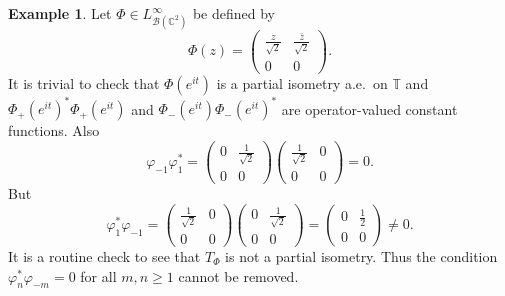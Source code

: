 \documentclass[12pt]{amsart}
\newcommand{\clb}{\mathcal{B}}
\newcommand{\C}{\mathbb{C}}
\newcommand{\T}{\mathbb{T}}
\theoremstyle{definition}
\theoremstyle{plain}
\theoremstyle{definition}
\newtheorem{ex}[thm]{Example}
\numberwithin{equation}{section}
\let\phi=\varphi
\begin{document}
\begin{ex}
Let $\Phi \in L^\infty_{\clb(\C^2)}$ be defined by
\[
\Phi(z)=\begin{pmatrix}
\frac{z}{\sqrt2} &\frac{\bar{z}}{\sqrt{2}}\\
0&0
\end{pmatrix}.
\]
It is trivial to check that $\Phi(e^{it})$ is a partial isometry a.e.\ on $\T$ and  $\Phi_+(e^{it})^*\Phi_+(e^{it})$ and $\Phi_-(e^{it})\Phi_-(e^{it})^*$ are operator-valued constant functions. Also
\[
\phi_{-1}\phi_{1}^*=\begin{pmatrix}
0 & \frac{1}{\sqrt{2}}\\
0 &0
\end{pmatrix}
\begin{pmatrix}
\frac{1}{\sqrt{2}} & 0\\
0 &0
\end{pmatrix}=0.
\]
But
\[
\phi_1^*\phi_{-1}=\begin{pmatrix}
\frac{1}{\sqrt{2}} &0 \\
0&0
\end{pmatrix}
\begin{pmatrix}
0 &\frac{1}{\sqrt{2}}\\
0 &0
\end{pmatrix}=\begin{pmatrix}
0&\frac{1}{2}\\
0 &0
\end{pmatrix} \neq 0.
\]
It is a routine check to see that $T_\Phi$ is not a partial isometry. Thus the condition $\phi_n^*\phi_{-m}=0$ for all $m, n \geq 1$ cannot be removed. 
\end{ex}
\end{document}
